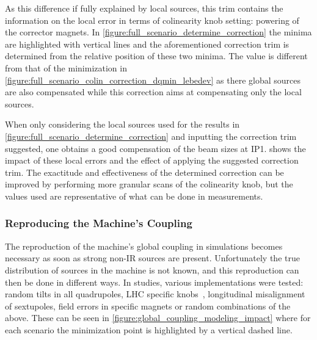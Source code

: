 As this difference if fully explained by local sources, this trim contains the information on the local error in terms of colinearity knob setting: powering of the corrector magnets.
In \cref{figure:full_scenario_determine_correction} the minima are highlighted with vertical lines and the aforementioned correction trim is determined from the relative position of these two minima.
The value is different from that of the minimization in \cref{figure:full_scenario_colin_correction_dqmin_lebedev} as there global sources are also compensated while this correction aims at compensating only the local sources.

When only considering the local sources used for the results in \cref{figure:full_scenario_determine_correction} and inputting the correction trim suggested, one obtains a good compensation of the beam sizes at IP\num{1}.
 shows the impact of these local errors and the effect of applying the suggested correction trim.
The exactitude and effectiveness of the determined correction can be improved by performing more granular scans of the colinearity knob, but the values used are representative of what can be done in measurements.

\subsubsection*{Reproducing the Machine's Coupling}

The reproduction of the machine's global coupling in simulations becomes necessary as soon as strong non-IR sources are present.
Unfortunately the true distribution of sources in the machine is not known, and this reproduction can then be done in different ways.
In studies, various implementations were tested: random tilts in all quadrupoles, LHC specific knobs~\cite{CERN:Tomas:Optimizing_Global_Coupling_Knobs_LHC}, longitudinal misalignment of sextupoles, field errors in specific magnets or random combinations of the above.
These can be seen in \cref{figure:global_coupling_modeling_impact} where for each scenario the minimization point is highlighted by a vertical dashed line.

